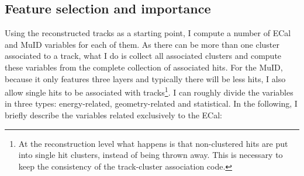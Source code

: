 \subsection{Feature selection and importance}

Using the reconstructed tracks as a starting point, I compute a number of ECal and MuID variables for each of them. As there can be more than one cluster associated to a track, what I do is collect all associated clusters and compute these variables from the complete collection of associated hits. For the MuID, because it only features three layers and typically there will be less hits, I also allow single hits to be associated with tracks\footnote{At the reconstruction level what happens is that non-clustered hits are put into single hit clusters, instead of being thrown away. This is necessary to keep the consistency of the track-cluster association code.}. I can roughly divide the variables in three types: energy-related, geometry-related and statistical. In the following, I briefly describe the variables related exclusively to the ECal:

